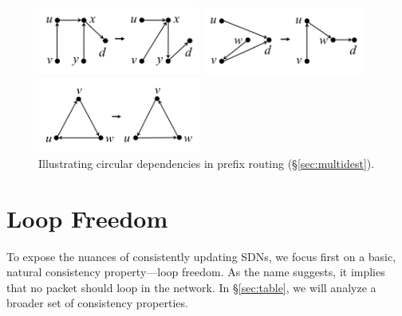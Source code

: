 
\begin{figure}[t!]
\begin{minipage}[b]{2.1in}
\centering
\includegraphics[width=2.1in]{figures/noloops.png}
\caption{Illustrating loop freedom (\S\ref{sec:loop-free}).}
\label{fig:example}
\end{minipage}
\hfill
\begin{minipage}[b]{2.1in}
\centering
\includegraphics[width=2.1in]{figures/nominimum.png}
\caption{Illustrating multiple minimal solutions (\S\ref{sec:minimal}).}
\label{fig:minimal}
\end{minipage}
\hfill
\begin{minipage}[b]{2.1in}
\centering
\includegraphics[width=2.1in]{figures/multidest.png}
\caption{Illustrating circular dependencies in prefix routing (\S\ref{sec:multidest}).}
\label{fig:multidest}
\end{minipage}
\end{figure}



\section{Loop Freedom}
\label{sec:loop-free}

To expose the nuances of consistently updating SDNs, we focus first on a basic, natural consistency property---loop freedom. As the name suggests, it implies that no packet should loop in the network.  In \S\ref{sec:table}, we will analyze a broader set of consistency properties.

